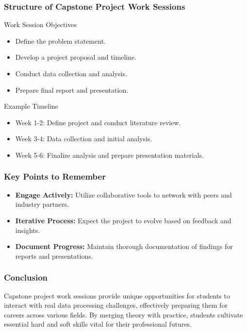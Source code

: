 \documentclass{beamer}
\begin{document}
\begin{frame}[fragile]
    \frametitle{Structure of Capstone Project Work Sessions}
    \begin{block}{Work Session Objectives}
        \begin{itemize}
            \item Define the problem statement.
            \item Develop a project proposal and timeline.
            \item Conduct data collection and analysis.
            \item Prepare final report and presentation.
        \end{itemize}
    \end{block}

    \begin{block}{Example Timeline}
        \begin{itemize}
            \item Week 1-2: Define project and conduct literature review.
            \item Week 3-4: Data collection and initial analysis.
            \item Week 5-6: Finalize analysis and prepare presentation materials.
        \end{itemize}
    \end{block}
\end{frame}

\begin{frame}[fragile]
    \frametitle{Key Points to Remember}
    \begin{itemize}
        \item \textbf{Engage Actively:} Utilize collaborative tools to network with peers and industry partners.
        \item \textbf{Iterative Process:} Expect the project to evolve based on feedback and insights.
        \item \textbf{Document Progress:} Maintain thorough documentation of findings for reports and presentations.
    \end{itemize}
\end{frame}

\begin{frame}[fragile]
    \frametitle{Conclusion}
    Capstone project work sessions provide unique opportunities for students to interact with real data processing challenges, effectively preparing them for careers across various fields. By merging theory with practice, students cultivate essential hard and soft skills vital for their professional futures.
\end{frame}
\end{document}
